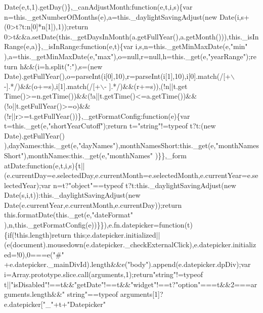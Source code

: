 \begin{DoxyCode}
{       Date(e,t,1).getDay()\},\_canAdjustMonth:function(e,t,i,s)\{var
       n=this.\_getNumberOfMonths(e),a=this.\_daylightSavingAdjust(new Date(i,s+(0>t?t:n[0]*n[1]),1));return
       0>t&&a.setDate(this.\_getDaysInMonth(a.getFullYear(),a.getMonth())),this.\_isInRange(e,a)\},\_isInRange:function(e,t)\{var i,s,n=this.\_getMinMaxDate(e,"}min\textcolor{stringliteral}{"
      ),a=this.\_getMinMaxDate(e,"}max\textcolor{stringliteral}{"),o=null,r=null,h=this.\_get(e,"}yearRange\textcolor{stringliteral}{");return h&&(i=h.split("}:\textcolor{stringliteral}{"),s=(new
       Date).getFullYear(),o=parseInt(i[0],10),r=parseInt(i[1],10),i[0].match(/[+\(\backslash\)-].*/)&&(o+=s),i[1].match(/[+\(\backslash\)-
      ].*/)&&(r+=s)),(!n||t.get
      Time()>=n.getTime())&&(!a||t.getTime()<=a.getTime())&&(!o||t.getFullYear()>=o)&&(!r||r>=t.getFullYear())\},\_getFormatConfig:function(e)\{var t=this.\_get(e,"}shortYearCutoff\textcolor{stringliteral}{");return t="}\textcolor{keywordtype}{string}\textcolor{stringliteral}{"!=typeof t?t:(new
       Date).getFullYear()%
      ),dayNames:this.\_get(e,"}dayNames\textcolor{stringliteral}{"),monthNamesShort:this.\_get(e,"}monthNamesShort\textcolor{stringliteral}{"),monthNames:this.\_get(e,"}monthNames\textcolor{stringliteral}{"
      )\}\},\_form
      atDate:function(e,t,i,s)\{t||(e.currentDay=e.selectedDay,e.currentMonth=e.selectedMonth,e.currentYear=e.selectedYear);var n=t?"}\textcolor{keywordtype}{object}\textcolor{stringliteral}{"==typeof t?t:this.\_daylightSavingAdjust(new
       Date(s,i,t)):this.\_daylightSavingAdjust(new Date(e.currentYear,e.currentMonth,e.currentDay));return this.formatDate(this.\_get(e,"}dateFormat\textcolor{stringliteral}{"
      ),n,this.\_getFormatConfig(e))\}\}),e.fn.datepicker=function(t)\{if(!this.length)return
       this;e.datepicker.initialized||(e(document).mousedown(e.datepicker.\_checkExternalClick),e.datepicker.initialized=!0),0===e("}#\textcolor{stringliteral}{"
      +e.datepicker.\_mainDivId).length&&e("}body\textcolor{stringliteral}{").append(e.datepicker.dpDiv);var
       i=Array.prototype.slice.call(arguments,1);return"}\textcolor{keywordtype}{string}\textcolor{stringliteral}{"!=typeof t||"}isDisabled\textcolor{stringliteral}{"!==t&&"}getDate\textcolor{stringliteral}{"!==t&&"}widget\textcolor{stringliteral}{"!==t?"}option\textcolor{stringliteral}{"===t&&2===arguments.length&&"}\textcolor{keywordtype}{
      string}\textcolor{stringliteral}{"==typeof arguments[1]?e.datepicker["}\_\textcolor{stringliteral}{"+t+"}Datepicker\textcolor{stringliteral}{"
}
\end{DoxyCode}
